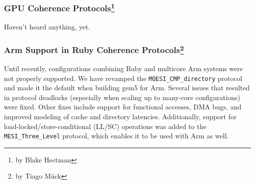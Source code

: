 \subsubsection[GPU Coherence Protocols]{GPU Coherence Protocols\footnote{by Blake Hectman}}

Haven't heard anything, yet.

\subsubsection[Arm Support and Extensions]{Arm Support in Ruby Coherence Protocols\footnote{by Tiago M{\"u}ck}}

Until recently, configurations combining Ruby and multicore Arm systems were not properly supported.
We have revamped the \verb|MOESI_CMP_directory| protocol and made it the default when building gem5 for Arm.
Several issues that resulted in protocol deadlocks (especially when scaling up to many-core configurations) were fixed.
Other fixes include support for functional accesses, DMA bugs, and improved modeling of cache and directory latencies.
Additionally, support for load-locked/store-conditional (LL/SC) operations was added to the \verb|MESI_Three_Level| protocol, which enables it to be used with Arm as well.
